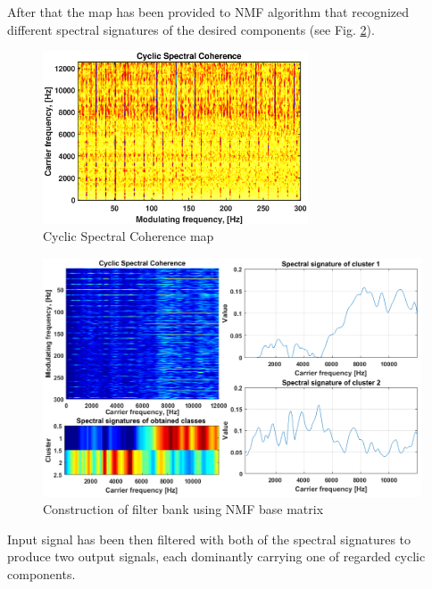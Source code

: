 \documentclass[10pt]{article}
\begin{document}
After that the map has been provided to NMF algorithm that recognized different spectral signatures of the desired components (see Fig. \ref{fig:trans}). 

\begin{figure}[h!]
\centering
\includegraphics[width=0.7\textwidth]{wykresy/csc}
\caption{Cyclic Spectral Coherence map}
\label{fig:csc}
\end{figure}

\begin{figure}[h!]
\centering
\includegraphics[width=\textwidth]{wykresy/trans.png}
\caption{Construction of filter bank using NMF base matrix}
\label{fig:trans}
\end{figure}

Input signal has been then filtered with both of the spectral signatures to produce two output signals, each dominantly carrying one of regarded cyclic components.
\end{document}
